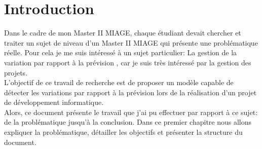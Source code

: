 \chapter{Introduction} %

\label{Chapitre1} %


Dans le cadre de mon Master II MIAGE, chaque étudiant devait chercher et traiter un sujet de niveau d'un \og  Master II MIAGE \fg{} qui présente une problématique réelle.
Pour cela je me suis intéressé à un sujet particulier: \og La gestion de la variation par rapport à la prévision \fg{}, car 
je suis très intéressé par la gestion des projets. \\ 
L'objectif de ce travail de recherche est de proposer un modèle capable de détecter les variations par rapport à la prévision 
lors de la réalisation d'un projet de développement informatique.\\
Alors, ce document présente le travail que j'ai pu effectuer par rapport à ce sujet: de la problématique jusqu'à la conclusion.
Dans ce premier chapitre nous allons expliquer la problématique, détailler les objectifs et présenter la structure du document.
